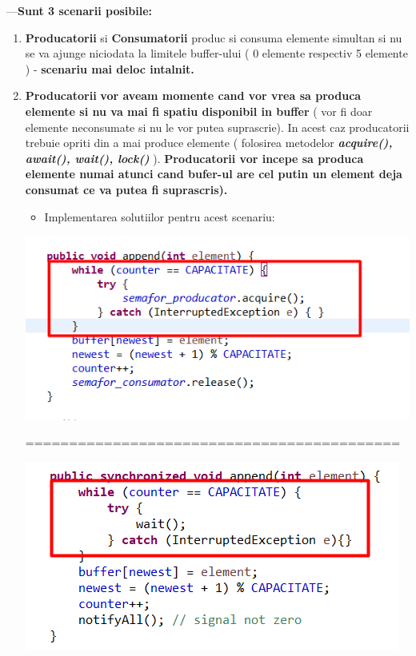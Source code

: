 \documentclass[14pt]{article}
\begin{document}
---\textbf{Sunt 3 scenarii posibile: }

\begin{enumerate}
\item \textbf{Producatorii} si \textbf{Consumatorii} produc si consuma elemente simultan si nu se va ajunge niciodata la limitele buffer-ului ( 0 elemente respectiv 5 elemente ) - \textbf{scenariu mai deloc intalnit.}
\item \textbf{Producatorii} \textbf{vor aveam momente cand vor vrea sa produca elemente si nu va mai fi spatiu disponibil in buffer} ( vor fi doar elemente neconsumate si nu le vor putea suprascrie). In acest caz  producatorii trebuie opriti din a mai produce elemente ( folosirea metodelor \textbf{\textit{acquire(), await(), wait(), lock()}} ). \textbf{Producatorii vor incepe sa produca elemente numai atunci cand bufer-ul are cel putin un element deja consumat ce va putea fi suprascris).}



\begin{itemize}
\item Implementarea solutiilor pentru acest scenariu:
\end{itemize}


\begin{center}\includegraphics[height=1.70 in, width = 3.4 in]{prodStop3.png}
\end{center}

===========================================

\begin{center}\includegraphics[height=1.7 in, width = 3.5 in]{prodStop2.png}
\end{center}


\end{enumerate}
\end{document}

